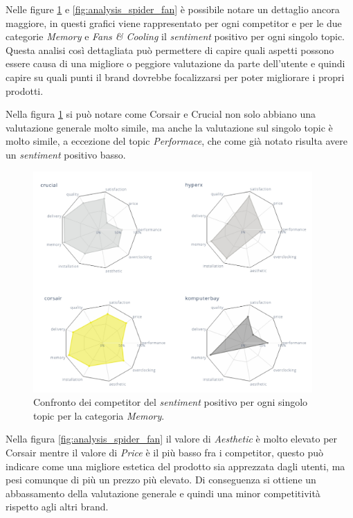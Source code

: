 \newpage 

Nelle figure \ref{fig:analysis_spider_memory} e \ref{fig:analysis_spider_fan} è possibile notare un dettaglio ancora maggiore, in questi grafici viene rappresentato per ogni competitor e per le due categorie \textit{Memory} e \textit{Fans \& Cooling} il \textit{sentiment} positivo per ogni singolo topic.
Questa analisi così dettagliata può permettere di capire quali aspetti possono essere causa di una migliore o peggiore valutazione da parte dell'utente e quindi capire su quali punti il brand dovrebbe focalizzarsi per poter migliorare i propri prodotti.

Nella figura \ref{fig:analysis_spider_memory} si può notare come Corsair e Crucial non solo abbiano una valutazione generale molto simile, ma anche la valutazione sul singolo topic è molto simile, a eccezione del topic \textit{Performace}, che come già notato risulta avere un \textit{sentiment} positivo basso.

\begin{figure}[ht]
  \centering
  \includegraphics[width=0.95\textwidth]{images/analysis/analysis_memory_spider.jpg}
  \caption{Confronto dei competitor del \textit{sentiment} positivo per ogni singolo topic per la categoria \textit{Memory}.}
  \label{fig:analysis_spider_memory}
\end{figure}

Nella figura \ref{fig:analysis_spider_fan} il valore di \textit{Aesthetic} è molto elevato per Corsair mentre il valore di \textit{Price} è il più basso fra i competitor, questo può indicare come una migliore estetica del prodotto sia apprezzata dagli utenti, ma pesi comunque di più un prezzo più elevato. Di conseguenza si ottiene un abbassamento della valutazione generale e quindi una minor competitività rispetto agli altri brand.


